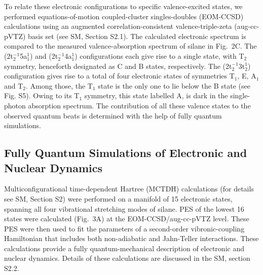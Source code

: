 \documentclass[12pt]{article}
\begin{document}
To relate these electronic configurations to specific valence-excited states, we performed equations-of-motion coupled-cluster singles-doubles (EOM-CCSD) calculations using an augmented correlation-consistent valence-triple-zeta (aug-cc-pVTZ) basis set (see SM, Section S2.1). The calculated electronic spectrum is compared to the measured valence-absorption spectrum of silane in Fig.~2C. The (2t$_2^{-1}$5a$_1^1$) and (2t$_2^{-1}$4a$_1^1$) configurations each give rise to a single state, with T$_2$ symmetry, henceforth designated as C and B states, respectively. The (2t$_2^{-1}$3t$_2^1$) configuration gives rise to a total of four electronic states of symmetries T$_1$, E, A$_1$ and T$_2$. Among those, the T$_1$ state is the only one to lie below the B state (see Fig. S5). %
Owing to its T$_1$ symmetry, this state labelled A, is dark in the single-photon absorption spectrum. The contribution of all these valence states to the observed quantum beats is determined with the help of fully quantum simulations.

\subsection{Fully Quantum Simulations of Electronic and Nuclear Dynamics}

Multiconfigurational time-dependent Hartree (MCTDH) calculations \cite{meyer1990multi,meyer2009multidimensional}  (for details see SM, Section S2) were performed on a manifold of 15 electronic states, spanning all four vibrational stretching modes of silane. PES of the lowest 16 states were calculated (Fig.~3A) at the EOM-CCSD/aug-cc-pVTZ level. These PES were then used to fit the parameters of a second-order vibronic-coupling Hamiltonian \cite{koppel1984multimode} that includes both non-adiabatic and Jahn-Teller interactions. These calculations provide a fully quantum-mechanical description of electronic and nuclear dynamics. Details of these calculations are discussed in the SM, section S2.2.
\end{document}
